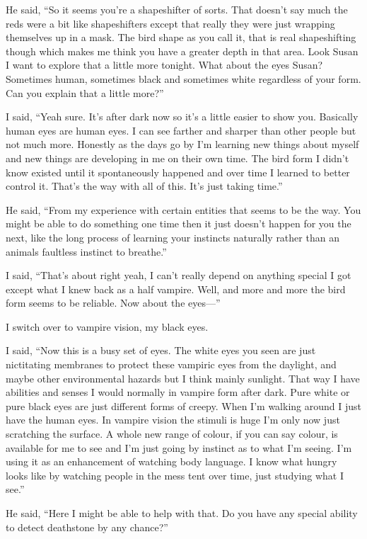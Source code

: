 He said, ``So it seems you're a shapeshifter of sorts. That doesn't say much the reds were a bit like shapeshifters except that really they were just wrapping themselves up in a mask. The bird shape as you call it, that is real shapeshifting though which makes me think you have a greater depth in that area. Look Susan I want to explore that a little more tonight. What about the eyes Susan? Sometimes human, sometimes black and sometimes white regardless of your form. Can you explain that a little more?''

I said, ``Yeah sure. It's after dark now so it's a little easier to show you. Basically human eyes are human eyes. I can see farther and sharper than other people but not much more. Honestly as the days go by I'm learning new things about myself and new things are developing in me on their own time. The bird form I didn't know existed until it spontaneously happened and over time I learned to better control it. That's the way with all of this. It's just taking time.''

He said, ``From my experience with certain entities that seems to be the way. You might be able to do something one time then it just doesn't happen for you the next, like the long process of learning your instincts naturally rather than an animals faultless instinct to breathe.''

I said, ``That's about right yeah, I can't really depend on anything special I got except what I knew back as a half vampire. Well, and more and more the bird form seems to be reliable. Now about the eyes---''

I switch over to vampire vision, my black eyes.

I said, ``Now this is a busy set of eyes. The white eyes you seen are just nictitating membranes to protect these vampiric eyes from the daylight, and maybe other environmental hazards but I think mainly sunlight. That way I have abilities and senses I would normally in vampire form after dark. Pure white or pure black eyes are just different forms of creepy. When I'm walking around I just have the human eyes. In vampire vision the stimuli is huge I'm only now just scratching the surface. A whole new range of colour, if you can say colour, is available for me to see and I'm just going by instinct as to what I'm seeing. I'm using it as an enhancement of watching body language. I know what hungry looks like by watching people in the mess tent over time, just studying what I see.''

He said, ``Here I might be able to help with that. Do you have any special ability to detect deathstone by any chance?''

